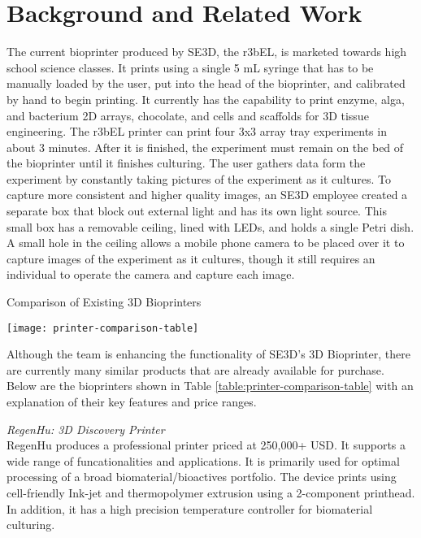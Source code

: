 
\section{Background and Related Work}

The current bioprinter produced by SE3D, the r3bEL, is marketed towards high school science classes. It prints using a single 5 mL syringe that has to be manually loaded by the user, put into the head of the bioprinter, and calibrated by hand to begin printing. It currently has the capability to print enzyme, alga, and bacterium 2D arrays, chocolate, and cells and scaffolds for 3D tissue engineering. The r3bEL printer can print four 3x3 array tray experiments in about 3 minutes. After it is finished, the experiment must remain on the bed of the bioprinter until it finishes culturing. The user gathers data form the experiment by constantly taking pictures of the experiment as it cultures. To capture more consistent and higher quality images, an SE3D employee created a separate box that block out external light and has its own light source. This small box has a removable ceiling, lined with LEDs, and holds a single Petri dish. A small hole in the ceiling allows a mobile phone camera to be placed over it to capture images of the experiment as it cultures, though it still requires an individual to operate the camera and capture each image.


\begin{table}[H]
\caption{\label{table:printer-comparison} Comparison of Existing 3D Bioprinters}
\texttt{[image: printer-comparison-table]}
\end{table}
Although the team is enhancing the functionality of SE3D’s 3D Bioprinter, there are currently many similar products that are already available for purchase. Below are the bioprinters shown in Table \ref{table:printer-comparison-table} with an explanation of their key features and price ranges.



\textit{RegenHu: 3D Discovery Printer} \\
RegenHu produces a professional printer priced at 250,000+ USD. It supports a wide range of funcationalities and applications. It is primarily used for optimal processing of a broad biomaterial/bioactives portfolio. The device prints using cell-friendly Ink-jet and thermopolymer extrusion using a 2-component printhead. In addition, it has a high precision temperature controller for biomaterial culturing.

